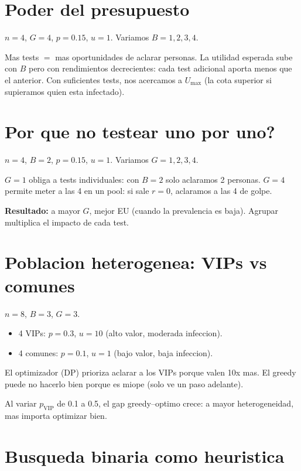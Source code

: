 \documentclass[11pt]{article}
\begin{document}
\section{Poder del presupuesto}

$n=4$, $G=4$, $p=0.15$, $u=1$. Variamos $B = 1, 2, 3, 4$.

Mas tests $=$ mas oportunidades de aclarar personas.
La utilidad esperada sube con $B$ pero con rendimientos decrecientes:
cada test adicional aporta menos que el anterior.
Con suficientes tests, nos acercamos a $U_{\max}$ (la cota superior si
supieramos quien esta infectado).

\section{Por que no testear uno por uno?}

$n=4$, $B=2$, $p=0.15$, $u=1$. Variamos $G = 1, 2, 3, 4$.

$G=1$ obliga a tests individuales: con $B=2$ solo aclaramos 2 personas.
$G=4$ permite meter a las 4 en un pool: si sale $r=0$, aclaramos a las 4 de golpe.

\textbf{Resultado:} a mayor $G$, mejor EU (cuando la prevalencia es baja).
Agrupar multiplica el impacto de cada test.

\section{Poblacion heterogenea: VIPs vs comunes}

$n=8$, $B=3$, $G=3$.
\begin{itemize}
  \item 4 VIPs: $p=0.3$, $u=10$ (alto valor, moderada infeccion).
  \item 4 comunes: $p=0.1$, $u=1$ (bajo valor, baja infeccion).
\end{itemize}

El optimizador (DP) prioriza aclarar a los VIPs porque valen 10x mas.
El greedy puede no hacerlo bien porque es miope (solo ve un paso adelante).

Al variar $p_{\text{VIP}}$ de 0.1 a 0.5, el gap greedy--optimo crece:
a mayor heterogeneidad, mas importa optimizar bien.

\section{Busqueda binaria como heuristica}
\end{document}
